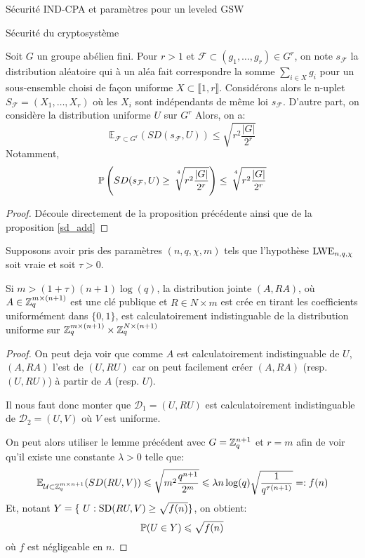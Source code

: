 \begin{section}{Sécurité IND-CPA et paramètres pour un leveled GSW}
\begin{subsection}{Sécurité du cryptosystème}
	\begin{cor}
	Soit $G$ un groupe abélien fini. Pour $r > 1$ et 
	$\mathcal{F} \subset (g_1, \ldots, g_r) \in G^r$, on
	note
	 $s_\mathcal{F}$ la distribution aléatoire qui à un aléa
	 fait correspondre la somme $\sum_{i\in X} g_i$ pour un
	 sous-ensemble choisi de façon uniforme  $X\subset \llbracket
	 1, r \rrbracket$. 
	 Considérons alors le n-uplet $S_\mathcal{F} = (X_1, \ldots, X_r)$ où 
	 les $X_i$ sont indépendants de même loi
	 $s_\mathcal{F}$.
	 D'autre part, on considère la distribution uniforme
	 $U$ sur $G^r$
	 Alors, on a: 
	 \[\mathbb{E}_{\mathcal{F}\subset G^r}(SD(s_\mathcal{F},U)) \leqslant
	   \sqrt{r^2\frac{|G|}{2^r}}\]
	 Notamment, 
	 \[\mathbb{P}\left(SD(s_\mathcal{F},U) \geq
		 \sqrt[\leftroot{-3}\uproot{8}4\:]{r^2\frac{|G|}{2^r}} \right) \leq
		 \sqrt[\leftroot{-3}\uproot{8}4\:]{r^2\frac{|G|}{2^r}}
	 \]
	\end{cor}
	\begin{proof}
		Découle directement de la proposition précédente ainsi que de
		la proposition \ref{sd_add}
	\end{proof}

	\begin{prop}
	Supposons avoir pris des paramètres $(n, q, \chi, m)$ tels que l'hypothèse $\text{LWE}_{n,q,\chi}$ soit vraie et soit $\tau > 0$.

	Si $m > (1+\tau)(n+1)\log(q)$, la distribution jointe $(A, RA)$, où 
	$A\in\mathbb{Z}_q^{m \times (n+1)}$ est une clé publique et $R \in{N \times m}$ est crée en tirant les coefficients
	uniformément dans $\{0,1\}$, est calculatoirement indistinguable de la
	distribution uniforme sur $\mathbb{Z}_q^{m \times (n+1)} \times \mathbb{Z}_q^{N
	\times (n+1)}$
	\end{prop}
	\begin{proof}
	On peut deja voir que comme $A$ est calculatoirement
	indistinguable de $U$, $(A, RA)$ l'est de $(U,RU)$ car on 
	peut facilement créer $(A, RA)$ (resp. $(U, RU)$) à partir de
	$A$ (resp. $U$).

	Il nous faut donc monter que $\mathcal{D}_1 = (U, RU)$ est calculatoirement
	indistinguable de $\mathcal{D}_2 = (U, V)$ où $V$ est uniforme.
	
	On peut alors utiliser le lemme précédent avec $G = \mathbb{Z}_q^{n+1}$
	et $r = m$ afin de voir qu'il existe une constante $\lambda > 0$
	telle que:
	\[\mathbb{E}_{\mathcal{U}\subset \mathbb{Z}_q^{m\times n+1}}(SD(RU,V)) \leqslant
		\sqrt{m^2\frac{q^{n+1}}{2^m}}\leqslant \lambda
	n\log(q)\sqrt{\frac{1}{q^{\tau(n+1)}}}=: f(n) \]
	Et, notant $Y = \{ U: \SD(RU,V) \geq \sqrt{f(n)}\}$, on obtient:
	\[\mathbb{P}(U \in Y) \leqslant \sqrt{f(n)} \]
	où $f$ est négligeable en $n$. 


\end{proof}
\end{subsection}
\end{section}
